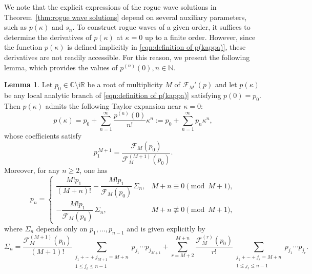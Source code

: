 \documentclass[preprint,3p,10pt]{elsarticle}
\theoremstyle{definition}
\newtheorem{lemma}{Lemma}[section]
\begin{document}
We note that the explicit expressions of the rogue wave solutions in Theorem~\ref{thm:rogue wave solutions} depend on several auxiliary parameters, such as $p(\kappa)$ and $s_n$. 
To construct rogue waves of a given order, it suffices to determine the derivatives of $p(\kappa)$ at $\kappa=0$ up to a finite order. 
However, since the function $p(\kappa)$ is defined implicitly in \eqref{eqn:definition of p(kappa)}, these derivatives are not readily accessible.
For this reason, we present the following lemma, which provides the values of $p^{(n)}(0), n\in\mathbb{N}$.

\begin{lemma} \label{lemma:expression of pn}
Let \(p_0\in\mathbb{C}\setminus\mathrm{i}\mathbb{R}\) be a root of
multiplicity \(M\) of \(\mathcal{F}_M'(p)\) and let
\(p(\kappa)\) be any local analytic branch of
\eqref{eqn:definition of p(kappa)} satisfying \(p(0)=p_0\).
Then \(p(\kappa)\) admits the following Taylor expansion near
\(\kappa=0\):
\begin{equation}\label{eq:p-series}
p(\kappa)=p_0+\sum_{n=1}^{\infty} \frac{p^{(n)}(0)}{n!} \kappa^n :=p_0+\sum_{n=1}^{\infty}p_n\kappa^n,
\end{equation}
whose coefficients satisfy
\begin{equation}\label{eq:a1-formula}
p_1^{\,M+1}=\dfrac{\mathcal{F}_M(p_0)}{\mathcal{F}_M^{(M+1)}(p_0)}.
\end{equation}
Moreover, for any $n\ge 2$, one has
\begin{equation}\label{eq:pn-recursive-simplified}
p_n=
\begin{cases}
\dfrac{M!p_1}{(M+n)!}
-\dfrac{M!p_1}{\mathcal{F}_M(p_0)}\,\Sigma_n,
& M+n \equiv 0 \pmod{M+1},\\[2ex]
-\dfrac{M!p_1}{\mathcal{F}_M(p_0)}\,\Sigma_n,
& M+n \not\equiv 0 \pmod{M+1},
\end{cases}
\end{equation}
where $\Sigma_n$ depends only on $p_1,\dots,p_{n-1}$ and is given explicitly by
\begin{equation}\label{eq:Sigma-n}
\Sigma_n=
\frac{\mathcal{F}_M^{(M+1)}(p_0)}{(M+1)!}
\!\!\!\sum_{\substack{j_1+\cdots+j_{M+1}=M+n\\ 1\le j_\ell\le n-1}}
\!\!\! p_{j_1}\cdots p_{j_{M+1}}
+\sum_{r=M+2}^{M+n}\frac{\mathcal{F}_M^{(r)}(p_0)}{r!}
\!\!\!\sum_{\substack{j_1+\cdots+j_r=M+n\\ 1\le j_\ell\le n-1}}
\!\!\! p_{j_1}\cdots p_{j_r}.
\end{equation}
\end{lemma}
\end{document}
